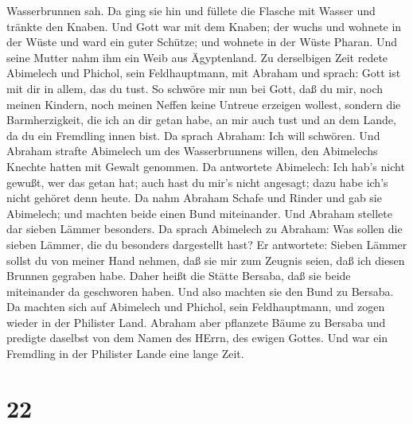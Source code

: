 Wasserbrunnen sah. Da ging sie hin und füllete die Flasche mit Wasser
und tränkte den Knaben.  Und Gott war mit dem Knaben; der
wuchs und wohnete in der Wüste und ward ein guter Schütze; 
und wohnete in der Wüste Pharan. Und seine Mutter nahm ihm ein Weib aus
Ägyptenland.  Zu derselbigen Zeit redete Abimelech und
Phichol, sein Feldhauptmann, mit Abraham und sprach: Gott ist mit dir in
allem, das du tust.  So schwöre mir nun bei Gott, daß du
mir, noch meinen Kindern, noch meinen Neffen keine Untreue erzeigen
wollest, sondern die Barmherzigkeit, die ich an dir getan habe, an mir
auch tust und an dem Lande, da du ein Fremdling innen bist.
 Da sprach Abraham: Ich will schwören.  Und
Abraham strafte Abimelech um des Wasserbrunnens willen, den Abimelechs
Knechte hatten mit Gewalt genommen.  Da antwortete
Abimelech: Ich hab's nicht gewußt, wer das getan hat; auch hast du mir's
nicht angesagt; dazu habe ich's nicht gehöret denn heute. 
Da nahm Abraham Schafe und Rinder und gab sie Abimelech; und machten
beide einen Bund miteinander.  Und Abraham stellete dar
sieben Lämmer besonders.  Da sprach Abimelech zu Abraham:
Was sollen die sieben Lämmer, die du besonders dargestellt hast?
 Er antwortete: Sieben Lämmer sollst du von meiner Hand
nehmen, daß sie mir zum Zeugnis seien, daß ich diesen Brunnen gegraben
habe.  Daher heißt die Stätte Bersaba, daß sie beide
miteinander da geschworen haben.  Und also machten sie den
Bund zu Bersaba. Da machten sich auf Abimelech und Phichol, sein
Feldhauptmann, und zogen wieder in der Philister Land. 
Abraham aber pflanzete Bäume zu Bersaba und predigte daselbst von dem
Namen des HErrn, des ewigen Gottes.  Und war ein Fremdling
in der Philister Lande eine lange Zeit.

\hypertarget{section-21}{%
\section{22}\label{section-21}}

